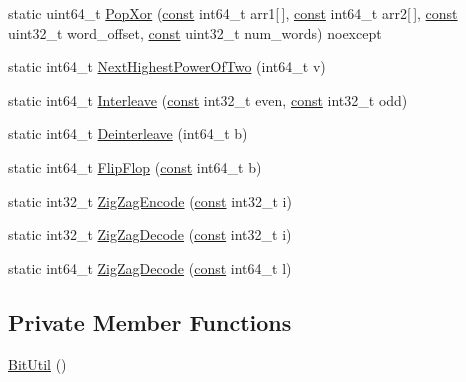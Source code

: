 \begin{DoxyCompactItemize}
\item 
static uint64\+\_\+t \mbox{\hyperlink{classlucene_1_1core_1_1util_1_1BitUtil_ae7893c706c1b8e661bdf23a5fc4b9a2a}{Pop\+Xor}} (\mbox{\hyperlink{ZlibCrc32_8h_a2c212835823e3c54a8ab6d95c652660e}{const}} int64\+\_\+t arr1\mbox{[}$\,$\mbox{]}, \mbox{\hyperlink{ZlibCrc32_8h_a2c212835823e3c54a8ab6d95c652660e}{const}} int64\+\_\+t arr2\mbox{[}$\,$\mbox{]}, \mbox{\hyperlink{ZlibCrc32_8h_a2c212835823e3c54a8ab6d95c652660e}{const}} uint32\+\_\+t word\+\_\+offset, \mbox{\hyperlink{ZlibCrc32_8h_a2c212835823e3c54a8ab6d95c652660e}{const}} uint32\+\_\+t num\+\_\+words) noexcept
\item 
static int64\+\_\+t \mbox{\hyperlink{classlucene_1_1core_1_1util_1_1BitUtil_af25b05dbc6c2442598bf2928d56a59d5}{Next\+Highest\+Power\+Of\+Two}} (int64\+\_\+t v)
\item 
static int64\+\_\+t \mbox{\hyperlink{classlucene_1_1core_1_1util_1_1BitUtil_af64fe541adea9f69656c8a5b205d9a90}{Interleave}} (\mbox{\hyperlink{ZlibCrc32_8h_a2c212835823e3c54a8ab6d95c652660e}{const}} int32\+\_\+t even, \mbox{\hyperlink{ZlibCrc32_8h_a2c212835823e3c54a8ab6d95c652660e}{const}} int32\+\_\+t odd)
\item 
static int64\+\_\+t \mbox{\hyperlink{classlucene_1_1core_1_1util_1_1BitUtil_aa1592874b73e75ec582c9419026ad678}{Deinterleave}} (int64\+\_\+t b)
\item 
static int64\+\_\+t \mbox{\hyperlink{classlucene_1_1core_1_1util_1_1BitUtil_a3a692f77230f75e522b1accd7a80b64d}{Flip\+Flop}} (\mbox{\hyperlink{ZlibCrc32_8h_a2c212835823e3c54a8ab6d95c652660e}{const}} int64\+\_\+t b)
\item 
static int32\+\_\+t \mbox{\hyperlink{classlucene_1_1core_1_1util_1_1BitUtil_afd043a7b42383b39e01ee861062686aa}{Zig\+Zag\+Encode}} (\mbox{\hyperlink{ZlibCrc32_8h_a2c212835823e3c54a8ab6d95c652660e}{const}} int32\+\_\+t i)
\item 
static int32\+\_\+t \mbox{\hyperlink{classlucene_1_1core_1_1util_1_1BitUtil_a2065bc6828ac3c98b4192d9ad8ddb735}{Zig\+Zag\+Decode}} (\mbox{\hyperlink{ZlibCrc32_8h_a2c212835823e3c54a8ab6d95c652660e}{const}} int32\+\_\+t i)
\item 
static int64\+\_\+t \mbox{\hyperlink{classlucene_1_1core_1_1util_1_1BitUtil_a785be1cf99e515568a4adafb4dd806b8}{Zig\+Zag\+Decode}} (\mbox{\hyperlink{ZlibCrc32_8h_a2c212835823e3c54a8ab6d95c652660e}{const}} int64\+\_\+t l)
\end{DoxyCompactItemize}
\subsection*{Private Member Functions}
\begin{DoxyCompactItemize}
\item 
\mbox{\hyperlink{classlucene_1_1core_1_1util_1_1BitUtil_ad37aede44ae395f555529f558762573f}{Bit\+Util}} ()
\end{DoxyCompactItemize}
